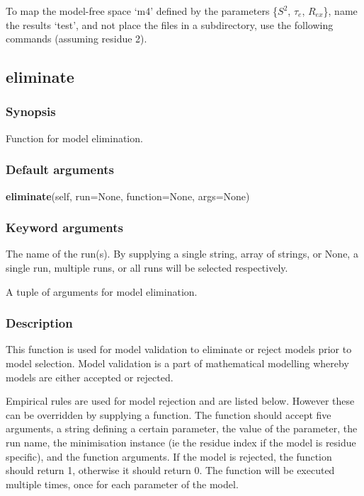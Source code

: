 To map the model-free space `m4' defined by the parameters \{$S^2$, $\tau_e$, $R_{ex}$\}, name the results
`test', and not place the files in a subdirectory, use the following commands (assuming
residue 2).




\newpage

\subsection{eliminate}


\subsubsection{Synopsis}

Function for model elimination.

\subsubsection{Default arguments}

\textsf{\textbf{eliminate}(self, run=None, function=None, args=None)}


\subsubsection{Keyword arguments}

  The name of the run(s).  By supplying a single string, array of strings, or None, a single run, multiple runs, or all runs will be selected respectively.

  A tuple of arguments for model elimination.

\subsubsection{Description}

This function is used for model validation to eliminate or reject models prior to model
selection.  Model validation is a part of mathematical modelling whereby models are either
accepted or rejected.

Empirical rules are used for model rejection and are listed below.  However these can be
overridden by supplying a function.  The function should accept five arguments, a string
defining a certain parameter, the value of the parameter, the run name, the minimisation
instance (ie the residue index if the model is residue specific), and the function
arguments.  If the model is rejected, the function should return 1, otherwise it should
return 0.  The function will be executed multiple times, once for each parameter of the
model.

